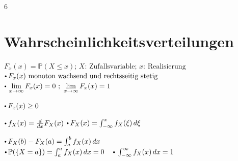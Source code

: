 \documentclass[8pt,a4paper,landscape]{extarticle}
\begin{document}
\begin{multicols*}{6}
        
















\columnbreak

\section{Wahrscheinlichkeitsverteilungen}
%

  $ F_x(x) = \mathbb{P}({X \leq x}) \text{; } X \text{: Zufallsvariable} \text{; } x \text{: Realisierung}$ 
  \vspace*{8pt}
  \vspace*{-2pt}
%
  \CheatsheetItemListStart
  \CheatsheetItemListEnd
%
    $\sbullet F_x(x) \text{ monoton wachsend und rechtsseitig stetig} $ \\
    $\sbullet \lim\limits_{x \to \infty} F_x(x) = 0 \text{ ; } \lim\limits_{x \to \infty} F_x(x) = 1 $ \\
    \par\vspace*{-5pt}
    $\sbullet F_x(x) \ge 0 $
%
  \par\vspace*{-6pt}
  {
%
    \vspace*{0pt}
    \CheatsheetItemListStart
      \color{MyPurple2}
    \CheatsheetItemListEnd
%
    $\sbullet f_X(x) = \frac{d}{dx} F_X(x)$
%
    \CheatsheetItemListStart
      \color{MyPurple2}
    \CheatsheetItemListEnd
%
    $\sbullet F_X(x) = \int_{-\infty}^{x} f_X(\xi) \, d\xi$
%
  
  }
%
    \vspace*{40pt}
    \CheatsheetItemListStart
      \color{orange}
    \CheatsheetItemListEnd
%
    $\sbullet F_X(b) - F_X(a) = \int_{a}^{b} f_X(x) \, dx$ \\
    $\sbullet \mathbb{P}(\{X = a\}) = \int_{a}^{a} f_X(x) \, dx = 0 \quad \sbullet \int_{-\infty}^{\infty} f_X(x) \, dx = 1$
%


\end{multicols*}
\end{document}
